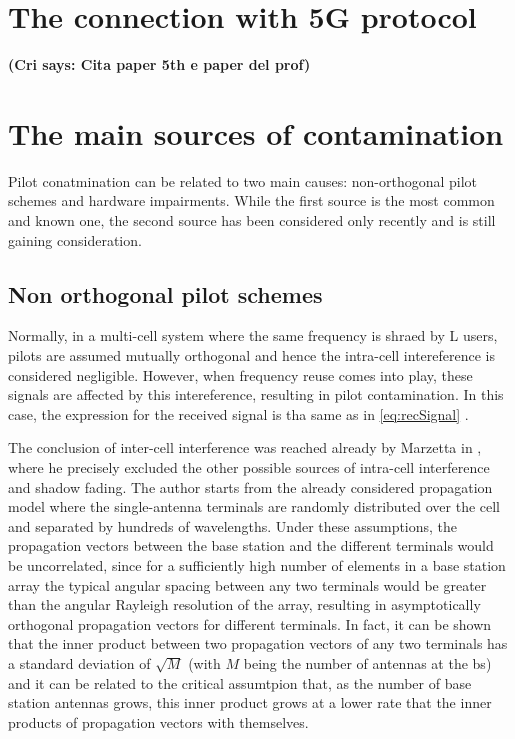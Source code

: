 \documentclass[11pt]{book}
\newcommand{\cri}[1]{\textcolor{MyColor2}{\textbf{(Cri says: #1)}}}
\begin{document}
\section{The connection with 5G protocol}
\cri{Cita paper 5th e paper del prof}
\section{The main sources of contamination}
Pilot conatmination can be related to two main causes: non-orthogonal pilot schemes and hardware impairments.
While the first source is the most common and known one, the second source has been considered only recently and is still gaining consideration.

\subsection{Non orthogonal pilot schemes}
Normally, in a multi-cell system where the same frequency is shraed by L users, pilots are assumed mutually orthogonal and hence the intra-cell intereference is considered negligible. However, when frequency reuse comes into play, these signals are affected by this intereference, resulting in pilot contamination. In this case, the expression for the received signal is tha same as in \ref{eq:recSignal} \cite{Elijah2016}.

The conclusion of inter-cell interference was reached already by Marzetta in \cite{Marzetta2010}, where he precisely excluded the other possible sources of intra-cell interference and shadow fading. The author starts from the already considered propagation model where the single-antenna terminals are randomly distributed over the cell and separated by hundreds of wavelengths. Under these assumptions, the propagation vectors between the base station and the different terminals would be uncorrelated, since for a sufficiently high number of elements in a base station array the typical angular spacing between any two terminals would be greater than the angular Rayleigh resolution of the array, resulting in asymptotically orthogonal propagation vectors for different terminals. In fact, it can be shown that the inner product between two propagation vectors of any two terminals has a standard deviation of $\sqrt{M}$ (with $M$ being the number of antennas at the \gls{bs}) and it can be related to the critical assumtpion that, as the number of base station antennas grows, this inner product grows at a lower rate that the inner products of propagation vectors with themselves.
\end{document}
